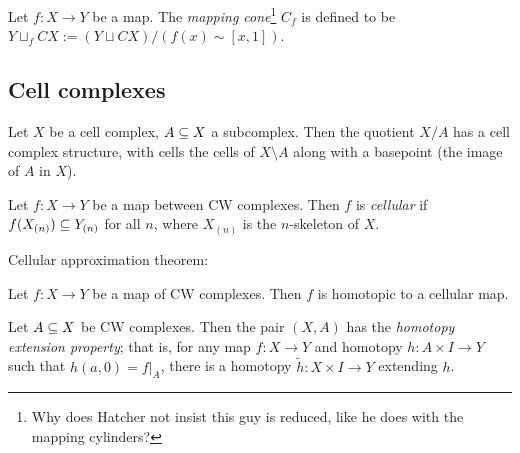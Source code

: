 \documentclass{MetricNotes2023}
\def\subq{\ensuremath\subseteq}
\begin{document}
\begin{definition}
Let \(f : X \to Y\) be a map. The \textit{mapping cone}\footnote{Why does Hatcher not insist this guy is reduced, like he does with the mapping cylinders?} \(C_f\) is defined to be \(Y\sqcup_f CX:=(Y\sqcup CX)/(f(x)\sim [x,1])\). 
\end{definition}

\subsection{Cell complexes}\label{2502141508}

\begin{definition}
Let \(X\) be a cell complex, \(A\subq X\) a subcomplex. Then the quotient \(X/A\) has a cell complex structure, with cells the cells of \(X\setminus A\) along with a basepoint (the image of \(A\) in \(X\)). 
\end{definition}

\begin{definition}
Let \(f : X \to Y\) be a map between CW complexes. Then \(f\) is \textit{cellular} if \(f(X_{(n)})\subq Y_{(n)}\) for all \(n\), where \(X_{(n)}\) is the \(n\)-skeleton of \(X\). 
\end{definition}

Cellular approximation theorem:

\begin{theorem}\label{2502211420}
Let \(f : X \to Y\) be a map of CW complexes. Then \(f\) is homotopic to a cellular map.
\end{theorem}

\begin{lemma}\label{2502211419}
Let \(A\subq X\) be CW complexes. Then the pair \((X, A)\) has the \textit{homotopy extension property}; that is, for any map \(f : X \to Y\) and homotopy \(h : A\times I \to Y\) such that \(h(a,0)=f|_A\), there is a homotopy \(\widetilde h : X\times I \to Y\) extending \(h\). 
\end{lemma}
\end{document}
